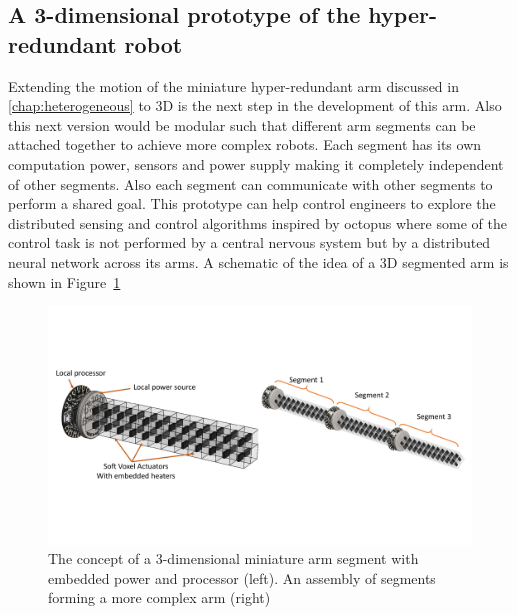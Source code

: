 \subsection{A 3-dimensional prototype of the hyper-redundant robot}
Extending the motion of the miniature hyper-redundant arm discussed in \ref{chap:heterogeneous} to 3D is the next step in the development of this arm. Also this next version would be modular such that different arm segments can be attached together to achieve more complex robots. Each segment has its own computation power, sensors and power supply making it completely independent of other segments. Also each segment can communicate with other segments to perform a shared goal. This prototype can help control engineers to explore the distributed sensing and control algorithms inspired by octopus where some of the control task is not performed by a central nervous system but by a distributed neural network across its arms. A schematic of the idea of a 3D segmented arm is shown in Figure~\ref{fig:3Darm}
\begin{figure}[!t]
\centering
\includegraphics[width=\textwidth]{3Darm.pdf}
    \caption[3-dimensional miniature arm]{The concept of a 3-dimensional miniature arm segment with embedded power and processor (left). An assembly of segments forming a more complex arm (right)}
    \label{fig:3Darm}
\end{figure}

